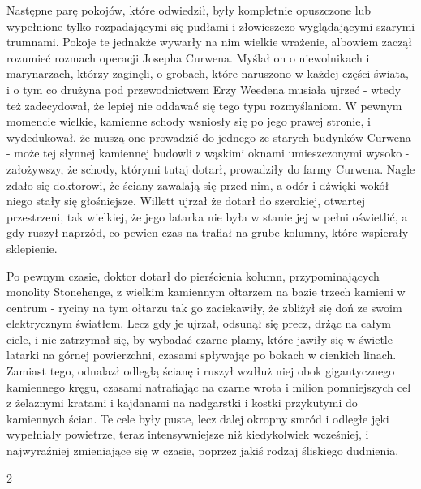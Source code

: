 Następne parę pokojów, które odwiedził, były kompletnie opuszczone lub wypełnione tylko rozpadającymi się pudłami i złowieszczo wyglądającymi szarymi trumnami. Pokoje te jednakże wywarły na nim wielkie wrażenie, albowiem zaczął rozumieć rozmach operacji Josepha Curwena. Myślał on o niewolnikach i marynarzach, którzy zaginęli, o grobach, które naruszono w każdej części świata, i o tym co drużyna pod przewodnictwem Erzy Weedena musiała ujrzeć - wtedy też zadecydował, że lepiej nie oddawać się tego typu rozmyślaniom. W pewnym momencie wielkie, kamienne schody wsniosły się po jego prawej stronie, i wydedukował, że muszą one prowadzić do jednego ze starych budynków Curwena - może tej słynnej kamiennej budowli z wąskimi oknami umieszczonymi wysoko - założywszy, że schody, którymi tutaj dotarł, prowadziły do farmy Curwena. Nagle zdało się doktorowi, że ściany zawalają się przed nim, a odór i dźwięki wokół niego stały się głośniejsze. Willett ujrzał że dotarł do szerokiej, otwartej przestrzeni, tak wielkiej, że jego latarka nie była w stanie jej w pełni oświetlić, a gdy ruszył naprzód, co pewien czas na trafiał na grube kolumny, które wspierały sklepienie. 

Po pewnym czasie, doktor dotarł do pierścienia kolumn, przypominających monolity Stonehenge, z wielkim kamiennym ołtarzem na bazie trzech kamieni w centrum - ryciny na tym ołtarzu tak go zaciekawiły, że zbliżył się doń ze swoim elektrycznym światłem. Lecz gdy je ujrzał, odsunął się precz, drżąc na całym ciele, i nie zatrzymał się, by wybadać czarne plamy, które jawiły się w świetle latarki na górnej powierzchni, czasami spływając po bokach w cienkich linach. Zamiast tego, odnalazł odległą ścianę i ruszył wzdłuż niej obok gigantycznego kamiennego kręgu, czasami natrafiając na czarne wrota i milion pomniejszych cel z żelaznymi kratami i kajdanami na nadgarstki i kostki przykutymi do kamiennych ścian. Te cele były puste, lecz dalej okropny smród i odległe jęki wypełniały powietrze, teraz intensywniejsze niż kiedykolwiek wcześniej, i najwyraźniej zmieniające się w czasie, poprzez jakiś rodzaj śliskiego dudnienia. 

\begin{center}
2
\end{center}

